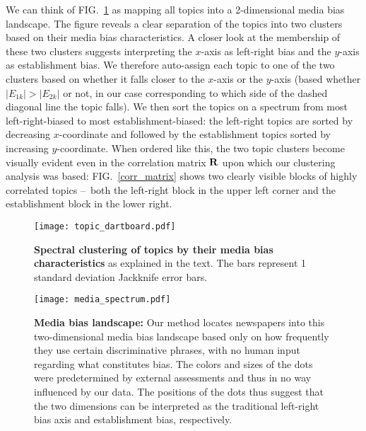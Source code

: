 \documentclass[10pt,letterpaper]{article}
\def\R{{\bf R}}
\def\fig#1{FIG.~\ref{#1}}
\begin{document}
We can think of \fig{dartboardFig} as mapping all topics into a 2-dimensional media bias landscape.
The figure reveals a clear separation of the topics into two clusters based on their media bias characteristics. 
A closer look at the membership of these two clusters suggests 
interpreting the $x$-axis as left-right bias and the $y$-axis as establishment bias.
We therefore auto-assign each topic to one of the two clusters based on whether it falls closer to the $x$-axis or the $y$-axis
(based whether $|E_{1k}|>|E_{2k}|$ or not, in our case corresponding to which side of the dashed diagonal line the topic falls).
We then sort the topics on a spectrum from most left-right-biased to most establishment-biased:
the left-right topics are sorted by decreasing $x$-coordinate and followed by the establishment topics sorted by increasing $y$-coordinate.
When ordered like this, the two topic clusters become visually evident even in the correlation matrix $\R$ upon which our clustering analysis was based:
\fig{corr_matrix} shows two clearly visible blocks of highly correlated topics – both the left-right block in the upper left corner and the establishment block in the lower right. 

\begin{figure}[tb] 
\caption{{\bf Spectral clustering of topics by their media bias characteristics} as explained in the text. The bars represent 1 standard deviation Jackknife error bars.}\texttt{[image: topic\_dartboard.pdf]}
 \label{dartboardFig}
\end{figure}


 \clearpage
 
 
 
\begin{figure}[tb] 
\caption{{\bf Media  bias landscape:}
Our method locates newspapers into this two-dimensional media bias landscape 
based only on how frequently they use certain discriminative phrases, with no human input regarding what constitutes bias. The colors and sizes of the dots were predetermined by external assessments and thus in no way influenced by our data. 
The positions of the dots thus suggest that the two dimensions can be 
interpreted as the traditional left-right bias axis and establishment bias, respectively. 
}\label{MediaLandscapeFig}\hglue-6cm \texttt{[image: media\_spectrum.pdf]} 
\end{figure}

\clearpage
\end{document}
